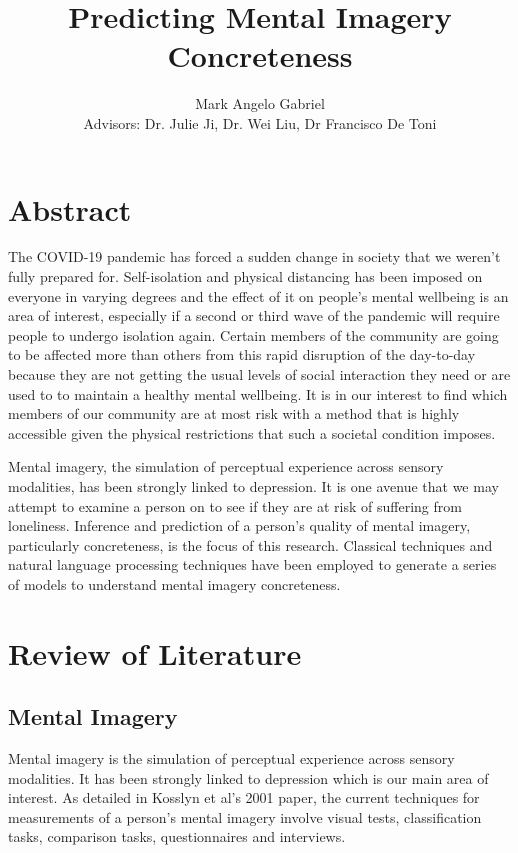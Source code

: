 \documentclass[12pt, a4paper]{article}
\title{Predicting Mental Imagery Concreteness}
\author{Mark Angelo Gabriel\\[0.5cm]{\small Advisors: Dr. Julie Ji, Dr. Wei Liu, Dr Francisco De Toni}}
\date{}
\begin{document}
\maketitle

\tableofcontents
\listoffigures
\listoftables


\section{Abstract} The COVID-19 pandemic has forced a sudden change in society that we weren't fully prepared for.  Self-isolation and physical distancing has been imposed on everyone in varying degrees and the effect of it on people's mental wellbeing is an area of interest, especially if a second or third wave of the pandemic will require people to undergo isolation again. Certain members of the community are going to be affected more than others from this rapid disruption of the day-to-day because they are not getting the usual levels of social interaction they need or are used to to maintain a healthy mental wellbeing. It is in our interest to find which members of our community are at most risk with a method that is highly accessible given the physical restrictions that such a societal condition imposes. 

Mental imagery, the simulation of perceptual experience across sensory modalities, has been strongly linked to depression. It is one avenue that we may attempt to examine a person on to see if they are at risk of suffering from loneliness. Inference and prediction of a person's quality of mental imagery, particularly concreteness, is the focus of this research. Classical techniques and natural language processing techniques have been employed to generate a series of models to understand mental imagery concreteness. 

\section{Review of Literature}

\subsection{Mental Imagery}
Mental imagery is the simulation of perceptual experience \cite{Kosslyn2001} across sensory modalities. It has been strongly linked to depression \cite{Patel2005} which is our main area of interest. As detailed in Kosslyn et al's 2001 paper, the current techniques for measurements of a person's mental imagery involve visual tests, classification tasks, comparison tasks, questionnaires and interviews. 
\end{document}

